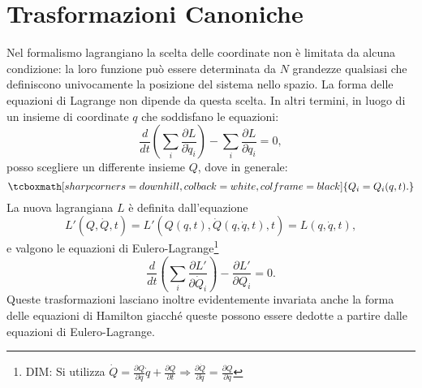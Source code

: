 \documentclass[a4paper,12pt,oneside]{book}
\begin{document}
\section[Trasformazioni Canoniche]{Trasformazioni Canoniche}
Nel formalismo lagrangiano la scelta delle coordinate non \`e limitata da alcuna condizione: la loro funzione pu\`o essere determinata da $N$ grandezze qualsiasi che definiscono univocamente la posizione del sistema nello spazio. La forma delle equazioni di Lagrange non dipende da questa scelta. In altri termini, in luogo di un insieme di coordinate $q$ che soddisfano le equazioni:
	\begin{equation}
		\frac{d}{dt}  \left( \sum_i\frac{\partial L}{\partial \dot{q}_i} \right) - \sum_i \frac{\partial L}{\partial q_i} = 0 ,
	\end{equation}
posso scegliere un differente insieme $Q$, dove in generale:
	\begin{equation}
		\tcboxmath[sharp corners=downhill, colback=white, colframe=black]{
			Q_i = Q_i(q,t) .
			}
		\label{eq:cap6_1}
	\end{equation}
La nuova lagrangiana $L$ \`e definita dall'equazione
	\begin{equation}
		L'(Q,\dot{Q},t) = L'\left(Q(q,t), \dot {Q}(q, \dot{q}, t), t \right) = L(q,\dot{q},t) ,
	\end{equation}
e valgono le equazioni di Eulero-Lagrange\footnote{DIM: Si utilizza $\dot{Q} = \frac{\partial Q}{\partial q}\dot{q} + \frac{\partial Q}{\partial t} \Rightarrow \frac{\partial \dot{Q}}{\partial \dot{q}} = \frac{\partial Q}{\partial q}$ }
	\begin{equation}
		\frac{d}{dt} \left( \sum_i \frac{\partial L'}{\partial \dot{Q}_i} \right) - \frac{\partial L'}{\partial Q_i} = 0 .
	\end{equation}
Queste trasformazioni lasciano inoltre evidentemente invariata anche la forma delle equazioni di Hamilton giacch\'e queste possono essere dedotte a partire dalle equazioni di Eulero-Lagrange.\\
\end{document}

